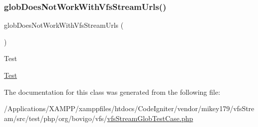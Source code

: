 \subsubsection{\texorpdfstring{glob\+Does\+Not\+Work\+With\+Vfs\+Stream\+Urls()}{globDoesNotWorkWithVfsStreamUrls()}}
{\footnotesize\ttfamily glob\+Does\+Not\+Work\+With\+Vfs\+Stream\+Urls (\begin{DoxyParamCaption}{ }\end{DoxyParamCaption})}

\begin{DoxyRefDesc}{Test}
\item[\mbox{\hyperlink{test__test000073}{Test}}]\end{DoxyRefDesc}


The documentation for this class was generated from the following file\+:\begin{DoxyCompactItemize}
\item 
/\+Applications/\+X\+A\+M\+P\+P/xamppfiles/htdocs/\+Code\+Igniter/vendor/mikey179/vfs\+Stream/src/test/php/org/bovigo/vfs/\mbox{\hyperlink{vfs_stream_glob_test_case_8php}{vfs\+Stream\+Glob\+Test\+Case.\+php}}\end{DoxyCompactItemize}
